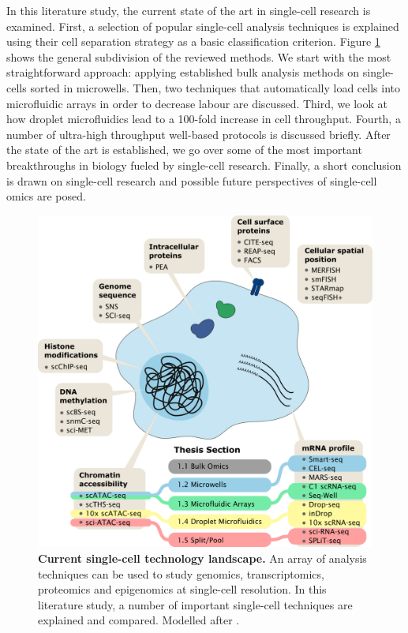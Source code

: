 In this literature study, the current state of the art in single-cell research is examined. First, a selection of popular single-cell analysis techniques is explained using their cell separation strategy as a basic classification criterion. Figure \ref{fig:stuart2019} shows the general subdivision of the reviewed methods. We start with the most straightforward approach: applying established bulk analysis methods on single-cells sorted in microwells. Then, two techniques that automatically load cells into microfluidic arrays in order to decrease labour are discussed. Third, we look at how droplet microfluidics lead to a 100-fold increase in cell throughput. Fourth, a number of ultra-high throughput well-based protocols is discussed briefly. After the state of the art is established, we go over some of the most important breakthroughs in biology fueled by single-cell research. Finally, a short conclusion is drawn on single-cell research and possible future perspectives of single-cell omics are posed.\pms

\begin{figure}[ht]
	\centerfloat
	\includegraphics[width=12cm]{./ims/stuart2019.png}
	\caption[Current single-cell technology landscape]{\textbf{Current single-cell technology landscape.} An array of analysis techniques can be used to study genomics, transcriptomics, proteomics and epigenomics at single-cell resolution. In this literature study, a number of important single-cell techniques are explained and compared. Modelled after \cite{stuart2019}.}
	\label{fig:stuart2019}
\end{figure}


